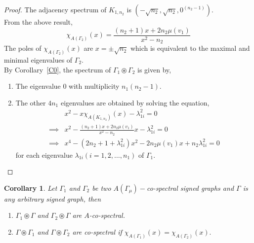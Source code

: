 \documentclass[12pt,a4paper]{article}
\newtheorem{corollary}{Corollary}[theorem]
\theoremstyle{definition}
\theoremstyle{remark}
\begin{document}
    \begin{proof}
        The adjacency spectrum of $K_{1,n_2}$ is $(-\sqrt{n_2},\sqrt{n_2},0^{(n_2-1)}).$\\
        From the above result, $$\chi_{A(\Gamma_2)}(x)=\frac{(n_2+1)x+2n_2\mu(v_1)}{x^2-n_2}$$
        The poles of $\chi_{A(\Gamma_2)}(x)$ are $x=\pm\sqrt{n_2}$ which is equivalent to the maximal and minimal eigenvalues of $\Gamma_2$.\\
        By Corollary~\ref{C0}, the spectrum of $\Gamma_1\circledast\Gamma_2$ is given by,
        \begin{enumerate}
            \item The eigenvalue $0$ with multiplicity $n_1(n_2-1)$.
            \item The other $4n_1$ eigenvalues are obtained by solving the equation,
            \begin{equation*}
                \begin{split}
                    &x^2-x\chi_{A(K_{1,n_2})}(x)-{\lambda}_{1i}^2=0\\
                    \implies&x^2-\frac{(n_2+1)x+2n_2\mu(v_1)}{x^2-n_2}x-{\lambda}_{1i}^2=0\\
                    \implies&x^4-(2n_2+1+{\lambda}_{1i}^2)x^2-2n_2\mu(v_1)x+n_2{\lambda}_{1i}^2=0
                \end{split}
            \end{equation*}
            for each eigenvalue ${\lambda}_{1i}(i=1,2,\ldots,n_1)$ of $\Gamma_{1}$.
        \end{enumerate}
        
    \end{proof}
    
     \begin{corollary}
         Let $\Gamma_1$ and $\Gamma_2$ be two $A(\Gamma_{\mu})-$co-spectral signed graphs and $\Gamma$ is any arbitrary signed graph, then 
            \begin{enumerate}
                \item $\Gamma_1\circledast\Gamma$ and $\Gamma_2\circledast\Gamma$ are $A$-co-spectral.
                \item $\Gamma\circledast\Gamma_1$ and $\Gamma\circledast\Gamma_2$ are co-spectral if $\chi_{A(\Gamma_1)}(x)=\chi_{A(\Gamma_2)}(x).$
            \end{enumerate}
     \end{corollary}
\end{document}
